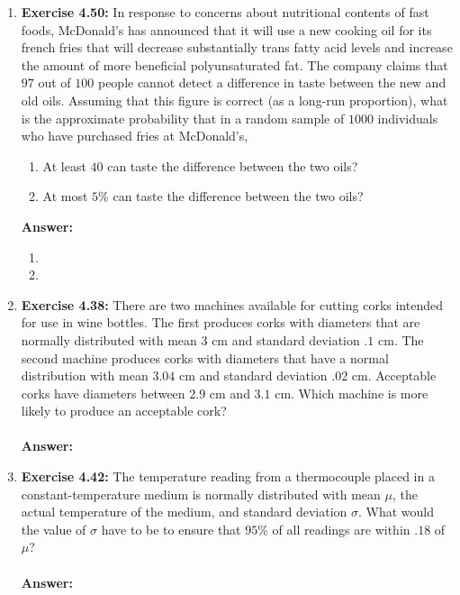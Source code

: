 \documentclass[12pt]{article}
\theoremstyle{homework}
\begin{document}
\begin{enumerate}
\item\hspace{.5in}\textbf{Exercise 4.50:} In response to concerns about nutritional contents of fast foods, McDonald’s has announced that it will use a new cooking oil for its french fries that will decrease substantially trans fatty acid levels and increase the amount of more beneficial polyunsaturated fat. The company claims that $97$ out of $100$ people cannot detect a difference in taste between the new and old oils. Assuming that this figure is correct (as a long-run proportion), what is the approximate probability that in a random sample of $1000$ individuals who have purchased fries at McDonald’s,
\begin{enumerate}
\item At least $40$ can taste the difference between the two oils?
\item At most $5\%$ can taste the difference between the two oils?
\end{enumerate}
\textbf{Answer:} 
\begin{enumerate}
\item
\item
\end{enumerate}
\vspace{.5in}




\item\hspace{.5in}\textbf{Exercise 4.38:} There are two machines available for cutting corks intended for use in wine bottles. The first produces corks with diameters that are normally distributed with mean 3 cm and standard deviation $.1$ cm. The second machine produces corks with diameters that have a normal distribution with mean $3.04$ cm and standard deviation $.02$ cm. Acceptable corks have diameters between $2.9$ cm and $3.1$ cm. Which machine is more likely to produce an acceptable cork?\\
\\
\textbf{Answer:} 
\vspace{.5in}




\item\hspace{.5in}\textbf{Exercise 4.42:} The temperature reading from a thermocouple placed in a constant-temperature medium is normally distributed with mean $\mu$, the actual temperature of the medium, and standard deviation $\sigma$. What would the value of $\sigma$ have to be to ensure that $95\%$ of all readings are within $.18$ of $\mu$?\\
\\
\textbf{Answer:} 
\vspace{.5in}





\end{enumerate}
\end{document}
